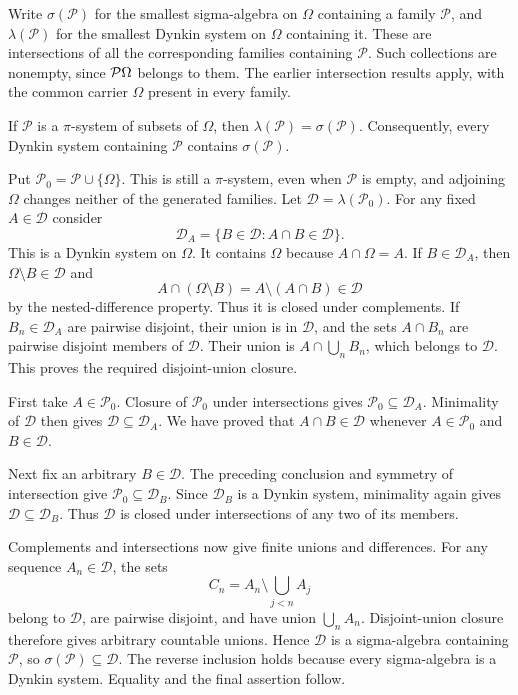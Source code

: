 Write $\sigma(\mathcal P)$ for the smallest sigma-algebra on
$\Omega$ containing a family $\mathcal P$, and $\lambda(\mathcal P)$
for the smallest Dynkin system on $\Omega$ containing it. These are
intersections of all the corresponding families containing
$\mathcal P$. Such collections are nonempty, since $\mathcal{P}\Omega$
belongs to them. The earlier intersection results apply, with the
common carrier $\Omega$ present in every family.

\begin{theorem}
\label{thm:pi_lambda}
If $\mathcal P$ is a $\pi$-system of subsets of $\Omega$, then
$\lambda(\mathcal P)=\sigma(\mathcal P)$. Consequently, every
Dynkin system containing $\mathcal P$ contains $\sigma(\mathcal P)$.
\end{theorem}
\Proof
Put $\mathcal P_0=\mathcal P\cup\{\Omega\}$. This is still a
$\pi$-system, even when $\mathcal P$ is empty, and adjoining
$\Omega$ changes neither of the generated families. Let
$\mathcal D=\lambda(\mathcal P_0)$. For any fixed $A\in\mathcal D$
consider
\[
\mathcal D_A=\{B\in\mathcal D:A\cap B\in\mathcal D\}.
\]
This is a Dynkin system on $\Omega$. It contains $\Omega$ because
$A\cap\Omega=A$. If $B\in\mathcal D_A$, then
$\Omega\setminus B\in\mathcal D$ and
\[
A\cap(\Omega\setminus B)=A\setminus(A\cap B)\in\mathcal D
\]
by the nested-difference property. Thus it is closed under complements.
If $B_n\in\mathcal D_A$ are pairwise disjoint, their union is in
$\mathcal D$, and the sets $A\cap B_n$ are pairwise disjoint members
of $\mathcal D$. Their union is $A\cap\bigcup_nB_n$, which belongs
to $\mathcal D$. This proves the required disjoint-union closure.

First take $A\in\mathcal P_0$. Closure of $\mathcal P_0$ under
intersections gives $\mathcal P_0\subseteq\mathcal D_A$.
Minimality of $\mathcal D$ then gives
$\mathcal D\subseteq\mathcal D_A$. We have proved that
$A\cap B\in\mathcal D$ whenever $A\in\mathcal P_0$ and
$B\in\mathcal D$.

Next fix an arbitrary $B\in\mathcal D$. The preceding conclusion
and symmetry of intersection give
$\mathcal P_0\subseteq\mathcal D_B$. Since $\mathcal D_B$ is a
Dynkin system, minimality again gives
$\mathcal D\subseteq\mathcal D_B$. Thus $\mathcal D$ is closed
under intersections of any two of its members.

Complements and intersections now give finite unions and differences.
For any sequence $A_n\in\mathcal D$, the sets
\[
C_n=A_n\setminus\bigcup_{j<n}A_j
\]
belong to $\mathcal D$, are pairwise disjoint, and have union
$\bigcup_nA_n$. Disjoint-union closure therefore gives arbitrary
countable unions. Hence $\mathcal D$ is a sigma-algebra containing
$\mathcal P$, so $\sigma(\mathcal P)\subseteq\mathcal D$.
The reverse inclusion holds because every sigma-algebra is a Dynkin
system. Equality and the final assertion follow.
\Done

